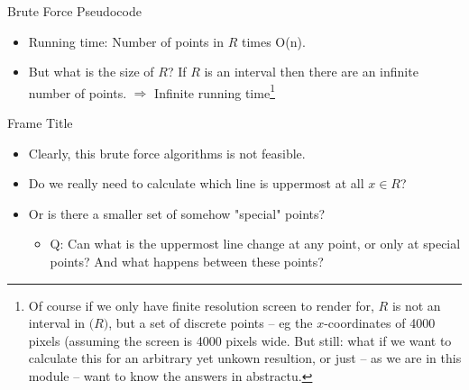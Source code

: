 \documentclass[ignorenonframetext,]{beamer}
\begin{document}
\begin{frame}{Brute Force Pseudocode}

  \begin{algorithm}[H]
    \caption{Removing Hidden Surfaces Brute Force}
    \begin{algorithmic}
       
       
      \EndFor
      \EndProcedure
    \end{algorithmic}
  \end{algorithm}
  \begin{itemize}
  \item Running time: Number of points in $R$ times O(n).
  \item But what is the size of $R$? If $R$ is an interval then there are an infinite number of points. $\Rightarrow$ Infinite running time\footnote{Of course if we only have finite resolution screen to render for, $R$ is not an interval in $\mathbf(R)$, but a set of discrete points -- eg the $x$-coordinates of 4000 pixels (assuming the screen is 4000 pixels wide. But still: what if we want to calculate this for an arbitrary yet unkown resultion, or just -- as we are in this module -- want to know the answers in abstractu.}
  \end{itemize}
\end{frame}

\begin{frame}{Frame Title}
    \begin{itemize}
        \item Clearly, this brute force algorithms is not feasible.
        \item Do we really need to calculate which line is uppermost at all $x \in R$?
        \item Or is there a smaller set of somehow "special" points?
        \begin{itemize}
            \item Q: Can what is the uppermost line change at any point, or only at special points? And what happens between these points?
        \end{itemize}
    \end{itemize}
\end{frame}
\end{document}
